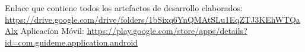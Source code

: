 \documentclass[12pt,letterpaper,openany]{book}
\begin{document}
Enlace que contiene todos los artefactos de desarrollo elaborados: \url{https://drive.google.com/drive/folders/1bSixq6YnQMAtSLu1EqZTJ3KEhWTQaAlx} 
\vspace{5mm}\newline
Aplicacíon Móvil: \url{https://play.google.com/store/apps/details?id=com.guideme.application.android}

\cleardoublepage
{}
\end{document}

